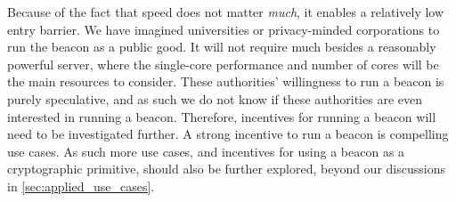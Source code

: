 Because of the fact that speed does not matter \emph{much}, it enables a relatively low entry barrier. We have imagined universities or privacy-minded corporations to run the beacon as a public good. It will not require much besides a reasonably powerful server, where the single-core performance and number of cores will be the main resources to consider. These authorities' willingness to run a beacon is purely speculative, and as such we do not know if these authorities are even interested in running a beacon. Therefore, incentives for running a beacon will need to be investigated further. A strong incentive to run a beacon is compelling use cases. As such more use cases, and incentives for using a beacon as a cryptographic primitive, should also be further explored, beyond our discussions in \vref{sec:applied_use_cases}.